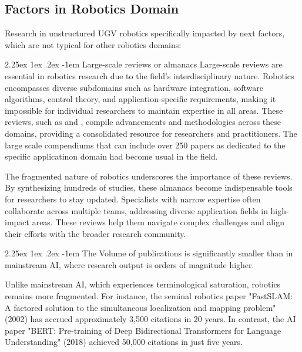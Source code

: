 \documentclass[runningheads]{llncs}
\makeatletter
\renewcommand\paragraph{\@startsection{paragraph}{4}{\z@}%
                                    {2.25ex \@plus1ex \@minus.2ex}%
                                    {-1em}%
                                    {\normalfont\normalsize\bfseries}}
\makeatother
\begin{document}
\subsection{Factors in Robotics Domain}

Research in unstructured UGV robotics specifically impacted by next factors, which are not typical for other robotics domains:

\paragraph{Large-scale reviews or almanacs}
Large-scale reviews are essential in robotics research due to the field's interdisciplinary nature. Robotics encompasses diverse subdomains such as hardware integration, software algorithms, control theory, and application-specific requirements, making it impossible for individual researchers to maintain expertise in all areas. These reviews, such as \cite{hausler2024towards} and \cite{vidanapathirana_wildscenes_2024}, compile advancements and methodologies across these domains, providing a consolidated resource for researchers and practitioners. The large scale compendiums that can include over 250 papers as \cite{min_autonomous_2024} dedicated to the specific applicatinon domain had become usual in the field.

The fragmented nature of robotics underscores the importance of these reviews. By synthesizing hundreds of studies, these almanacs become indispensable tools for researchers to stay updated. Specialists with narrow expertise often collaborate across multiple teams, addressing diverse application fields in high-impact areas. These reviews help them navigate complex challenges and align their efforts with the broader research community.


\paragraph{The Volume of publications}
is significantly smaller than in mainstream AI, where research output is orders of magnitude higher.

Unlike mainstream AI, which experiences terminological saturation, robotics remains more fragmented. For instance, the seminal robotics paper "FastSLAM: A factored solution to the simultaneous localization and mapping problem" (2002) has accrued approximately 3,500 citations in 20 years. In contrast, the AI paper "BERT: Pre-training of Deep Bidirectional Transformers for Language Understanding" (2018) achieved 50,000 citations in just five years.
\end{document}
